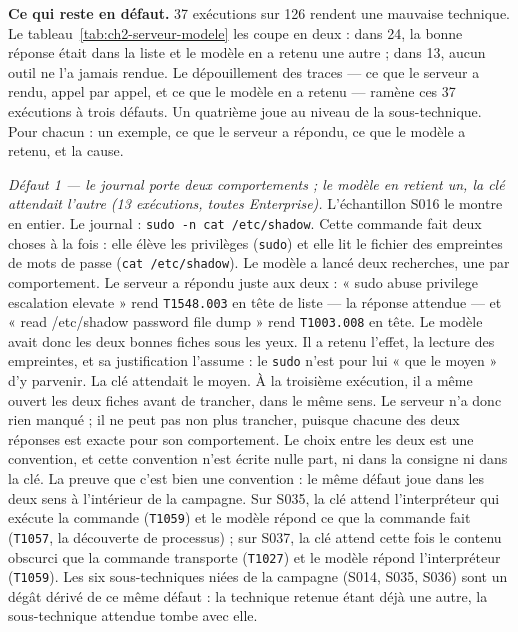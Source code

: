 \textbf{Ce qui reste en défaut.} 37 exécutions sur 126 rendent une mauvaise technique. Le tableau~\ref{tab:ch2-serveur-modele} les coupe en deux : dans 24, la bonne réponse était dans la liste et le modèle en a retenu une autre ; dans 13, aucun outil ne l'a jamais rendue. Le dépouillement des traces --- ce que le serveur a rendu, appel par appel, et ce que le modèle en a retenu --- ramène ces 37 exécutions à trois défauts. Un quatrième joue au niveau de la sous-technique. Pour chacun : un exemple, ce que le serveur a répondu, ce que le modèle a retenu, et la cause.

\emph{Défaut 1 --- le journal porte deux comportements ; le modèle en retient un, la clé attendait l'autre (13 exécutions, toutes Enterprise).} L'échantillon S016 le montre en entier. Le journal : \texttt{sudo -n cat /etc/shadow}. Cette commande fait deux choses à la fois : elle élève les privilèges (\texttt{sudo}) et elle lit le fichier des empreintes de mots de passe (\texttt{cat /etc/shadow}). Le modèle a lancé deux recherches, une par comportement. Le serveur a répondu juste aux deux : « sudo abuse privilege escalation elevate » rend \texttt{T1548.003} en tête de liste --- la réponse attendue --- et « read /etc/shadow password file dump » rend \texttt{T1003.008} en tête. Le modèle avait donc les deux bonnes fiches sous les yeux. Il a retenu l'effet, la lecture des empreintes, et sa justification l'assume : le \texttt{sudo} n'est pour lui « que le moyen » d'y parvenir. La clé attendait le moyen. À la troisième exécution, il a même ouvert les deux fiches avant de trancher, dans le même sens. Le serveur n'a donc rien manqué ; il ne peut pas non plus trancher, puisque chacune des deux réponses est exacte pour son comportement. Le choix entre les deux est une convention, et cette convention n'est écrite nulle part, ni dans la consigne ni dans la clé. La preuve que c'est bien une convention : le même défaut joue dans les deux sens à l'intérieur de la campagne. Sur S035, la clé attend l'interpréteur qui exécute la commande (\texttt{T1059}) et le modèle répond ce que la commande fait (\texttt{T1057}, la découverte de processus) ; sur S037, la clé attend cette fois le contenu obscurci que la commande transporte (\texttt{T1027}) et le modèle répond l'interpréteur (\texttt{T1059}). Les six sous-techniques niées de la campagne (S014, S035, S036) sont un dégât dérivé de ce même défaut : la technique retenue étant déjà une autre, la sous-technique attendue tombe avec elle.

